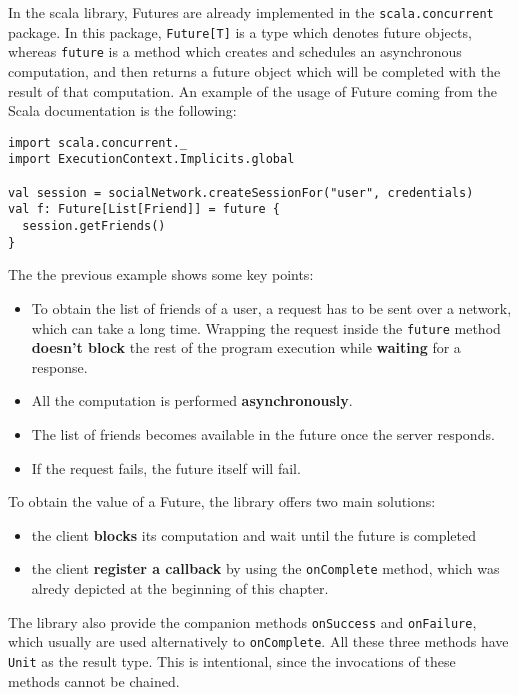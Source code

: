 In the scala library, Futures are already implemented in the
\texttt{scala.concurrent} package. In this package,
\texttt{Future{[}T{]}} is a type which denotes future objects, whereas
\texttt{future} is a method which creates and schedules an asynchronous
computation, and then returns a future object which will be completed
with the result of that computation. An example of the usage of Future
coming from the Scala documentation is the following:

\begin{verbatim}
import scala.concurrent._
import ExecutionContext.Implicits.global

val session = socialNetwork.createSessionFor("user", credentials)
val f: Future[List[Friend]] = future {
  session.getFriends()
}
\end{verbatim}

The the previous example shows some key points:

\begin{itemize}
\itemsep1pt\parskip0pt
\item
  To obtain the list of friends of a user, a request has to be sent over
  a network, which can take a long time. Wrapping the request inside the
  \texttt{future} method \textbf{doesn't block} the rest of the program
  execution while \textbf{waiting} for a response.
\item
  All the computation is performed \textbf{asynchronously}.
\item
  The list of friends becomes available in the future once the server
  responds.
\item
  If the request fails, the future itself will fail.
\end{itemize}

To obtain the value of a Future, the library offers two main solutions:

\begin{itemize}
\itemsep1pt\parskip0pt
\item
  the client \textbf{blocks} its computation and wait until the future
  is completed
\item
  the client \textbf{register a callback} by using the
  \texttt{onComplete} method, which was alredy depicted at the beginning
  of this chapter.
\end{itemize}

The library also provide the companion methods \texttt{onSuccess} and
\texttt{onFailure}, which usually are used alternatively to
\texttt{onComplete}. All these three methods have \texttt{Unit} as the
result type. This is intentional, since the invocations of these methods
cannot be chained.

